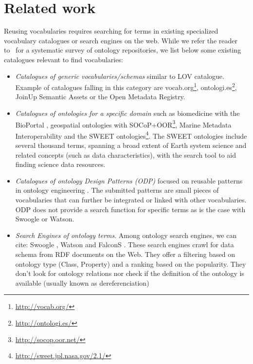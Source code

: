\documentclass{iosart2c}
\begin{document}
\section{Related work}
\label{sec:related}

Reusing vocabularies requires searching for terms in existing specialized vocabulary catalogues or search engines on the web. While we refer the reader to~\cite{AquinJoWS12} for a systematic survey of ontology repositories, we list below some existing catalogues relevant to find vocabularies:
\begin{itemize}
 \item \textit{Catalogues of generic vocabularies/schemas} similar to LOV catalogue. Example of catalogues falling in this category are vocab.org\footnote{\url{http://vocab.org/}}, ontologi.es\footnote{\url{http://ontologi.es/}}, JoinUp Semantic Assets or the Open Metadata Registry.
 \item \textit{Catalogues of ontologies for a specific domain} such as biomedicine with the BioPortal \cite{bioportal11}, geospatial ontologies with SOCoP+OOR\footnote{\url{http://socop.oor.net/}}, Marine Metadata Interoperability and the SWEET \cite{sweet05} ontologies\footnote{\url{http://sweet.jpl.nasa.gov/2.1/}}. The SWEET ontologies include several thousand terms, spanning a broad extent of Earth system science and related concepts (such as data characteristics), with the search tool to aid finding science data resources. 
 \item \textit{Catalogues of ontology Design Patterns (ODP)} focused on reusable patterns in ontology engineering \cite{presutti08}. The submitted patterns are small pieces of vocabularies that can further be integrated or linked with other vocabularies. ODP does not provide a search function for specific terms as is the case with Swoogle or Watson.
 \item \textit{Search Engines of ontology terms}. Among ontology search engines, we can cite: Swoogle \cite{finin2005swoogle}, Watson \cite{d2007watson,Sabou07} and FalconS \cite{cheng2008falcons}. These search engines crawl for data schema from RDF documents on the Web. They offer a filtering based on ontology type (Class, Property) and a ranking based on the popularity. They don't look for ontology relations nor check if the definition of the ontology is available (usually known as dereferenciation)
\end{itemize}
\end{document}
